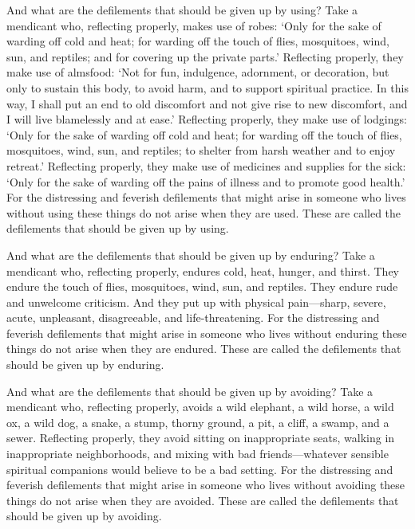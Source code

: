 \documentclass[12pt,openany]{book}%
\begin{document}
And what are the defilements that should be given up by using? Take a mendicant who, reflecting properly, makes use of robes: ‘Only for the sake of warding off cold and heat; for warding off the touch of flies, mosquitoes, wind, sun, and reptiles; and for covering up the private parts.’ Reflecting properly, they make use of almsfood: ‘Not for fun, indulgence, adornment, or decoration, but only to sustain this body, to avoid harm, and to support spiritual practice. In this way, I shall put an end to old discomfort and not give rise to new discomfort, and I will live blamelessly and at ease.’ Reflecting properly, they make use of lodgings: ‘Only for the sake of warding off cold and heat; for warding off the touch of flies, mosquitoes, wind, sun, and reptiles; to shelter from harsh weather and to enjoy retreat.’ Reflecting properly, they make use of medicines and supplies for the sick: ‘Only for the sake of warding off the pains of illness and to promote good health.’ For the distressing and feverish defilements that might arise in someone who lives without using these things do not arise when they are used. These are called the defilements that should be given up by using. 

And what are the defilements that should be given up by enduring? Take a mendicant who, reflecting properly, endures cold, heat, hunger, and thirst. They endure the touch of flies, mosquitoes, wind, sun, and reptiles. They endure rude and unwelcome criticism. And they put up with physical pain—sharp, severe, acute, unpleasant, disagreeable, and life-threatening. For the distressing and feverish defilements that might arise in someone who lives without enduring these things do not arise when they are endured. These are called the defilements that should be given up by enduring. 

And what are the defilements that should be given up by avoiding? Take a mendicant who, reflecting properly, avoids a wild elephant, a wild horse, a wild ox, a wild dog, a snake, a stump, thorny ground, a pit, a cliff, a swamp, and a sewer. Reflecting properly, they avoid sitting on inappropriate seats, walking in inappropriate neighborhoods, and mixing with bad friends—whatever sensible spiritual companions would believe to be a bad setting. For the distressing and feverish defilements that might arise in someone who lives without avoiding these things do not arise when they are avoided. These are called the defilements that should be given up by avoiding. 
\end{document}
